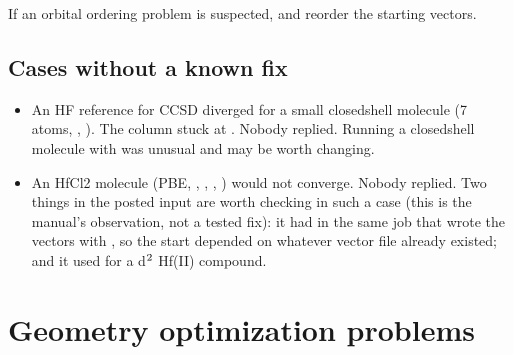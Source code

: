 \documentclass[letterpaper,10pt,english,openany,oneside]{sphinxmanual}
\begin{document}
\sphinxAtStartPar
If an orbital ordering problem is suspected, {\hyperref[\detokenize{reference/guess:guess-na}]{}} and {\hyperref[\detokenize{reference/guess:guess-nb}]{}} reorder the starting
vectors. 


\subsection{Cases without a known fix}
\label{\detokenize{troubleshooting/common-problems:cases-without-a-known-fix}}\begin{itemize}
\item {} 
\sphinxAtStartPar
An HF reference for CCSD diverged for a small closed\sphinxhyphen{}shell molecule (7 atoms, , ). The
 column stuck at . Nobody replied. Running a closed\sphinxhyphen{}shell molecule with  was
unusual and may be worth changing.



\item {} 
\sphinxAtStartPar
An HfCl2 molecule (PBE, , , , ) would not converge. Nobody replied.
Two things in the posted input are worth checking in such a case (this is the manual’s observation, not a tested
fix): it had  in the same job that wrote the vectors with , so the start depended on whatever
vector file already existed; and it used  for a d\(\sp{\text{2}}\) Hf(II) compound.



\end{itemize}


\section{Geometry optimization problems}
\label{\detokenize{troubleshooting/common-problems:geometry-optimization-problems}}\label{\detokenize{troubleshooting/common-problems:troubleshooting-optimization}}
\end{document}
